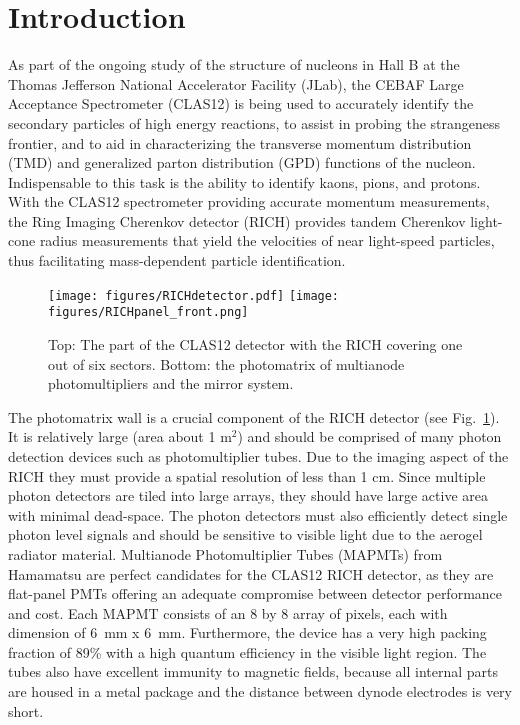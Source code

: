 \section{Introduction}
As part of the ongoing study of the structure of nucleons \cite{Avakian:2010ae}  in Hall B at the Thomas Jefferson National Accelerator Facility (JLab), the CEBAF Large Acceptance Spectrometer (CLAS12) \cite{Burkert:2020akg} is being used to accurately identify the secondary particles of high energy reactions, to assist in probing the strangeness frontier, and to aid in characterizing the transverse momentum distribution (TMD) and generalized parton distribution (GPD) functions of the nucleon. Indispensable to this task is the ability to identify kaons, pions, and protons.  With the CLAS12 spectrometer providing accurate momentum measurements, the Ring Imaging Cherenkov detector (RICH) \cite{Contalbrigo:2020,Contalbrigo:2020snw,Mirazita:2017vav,Contalbrigo:2014rqa} provides tandem Cherenkov light-cone radius measurements that yield the velocities of near light-speed particles, thus facilitating mass-dependent particle identification.

\begin{figure}[h!bt]
	\centering
	\texttt{[image: figures/RICHdetector.pdf]}
	\texttt{[image: figures/RICHpanel\_front.png]}
	\caption{Top: The part of the CLAS12 detector with the RICH covering one out of six sectors. Bottom: the photomatrix of multianode photomultipliers and the mirror system.}
	\label{fig:RICHdetector}
\end{figure}

The photomatrix  wall is a crucial component of the RICH detector (see Fig.~\ref{fig:RICHdetector}). It is relatively large (area about 1 m$^2$) and should be comprised of many photon detection devices such as photomultiplier tubes.
Due to the imaging aspect of the RICH they must provide a spatial resolution of less than 1 cm.
Since multiple photon detectors are tiled into large arrays, they should have large active area with minimal dead-space.
The photon detectors must also efficiently detect single photon level signals and should be sensitive to visible light due to the aerogel radiator material.
Multianode Photomultiplier Tubes (MAPMTs) from Hamamatsu are perfect candidates for the CLAS12 RICH detector, as they are flat-panel PMTs offering an adequate compromise between detector performance and cost.
Each MAPMT consists of an 8 by 8 array of pixels, each with dimension of 6~mm x 6~mm.
Furthermore, the device has a very high packing fraction of 89\% with a high quantum efficiency in the visible light region.
The tubes also have excellent immunity to magnetic fields, because all internal parts are housed in a metal package and the distance between dynode electrodes is very short.


